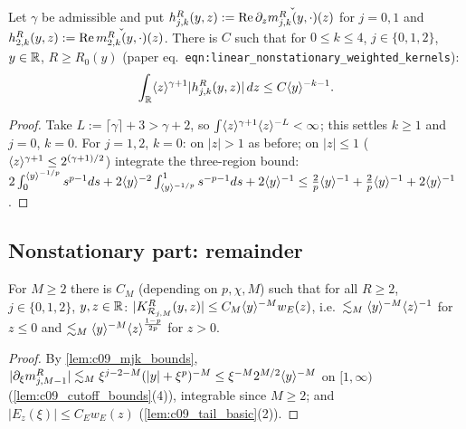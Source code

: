 \begin{lemma}
  \label{lem:c09_weighted_kernel_L1}
  Let $\gamma$ be admissible and put $h^R_{j,k}(y,z):=\operatorname{Re}\partial_z\widecheck{m^R_{j,k}(y,\cdot)}(z)$ for $j=0,1$ and $h^R_{2,k}(y,z):=\operatorname{Re}\widecheck{m^R_{2,k}(y,\cdot)}(z)$.
  There is $C$ such that for $0\le k\le4$, $j\in\{0,1,2\}$, $y\in\R$, $R\ge R_0(y)$ (paper eq.~\texttt{eqn:linear\_nonstationary\_weighted\_kernels}):
  \[
    \int_\R\ang{z}^{\gamma+1}|h^R_{j,k}(y,z)|\,dz\le C\ang{y}^{-k-1}.
  \]
\end{lemma}
\begin{proof}
  Take $L:=\lceil\gamma\rceil+3>\gamma+2$, so $\int\ang z^{\gamma+1}\ang z^{-L}<\infty$; this settles $k\ge1$ and $j=0$, $k=0$. For $j=1,2$, $k=0$: on $|z|>1$ as before;
  on $|z|\le1$ ($\ang z^{\gamma+1}\le2^{(\gamma+1)/2}$) integrate the three-region bound:
  $2\int_0^{\ang y^{-1/p}}s^{p-1}ds+2\ang{y}^{-2}\int_{\ang y^{-1/p}}^1s^{-p-1}ds+2\ang y^{-1}\le\frac2p\ang y^{-1}+\frac2p\ang y^{-1}+2\ang{y}^{-1}$.
\end{proof}

\subsection{Nonstationary part: remainder}

\begin{lemma}
  \label{lem:linear_nonstationary_remainder}
  For $M\ge2$ there is $C_M$ (depending on $p,\chi,M$) such that for all $R\ge2$, $j\in\{0,1,2\}$, $y,z\in\R$:
  $|K^R_{\mc R_{j,M}}(y,z)|\le C_M\ang{y}^{-M}w_E(z)$, i.e.\ $\lesssim_M\ang y^{-M}\ang z^{-1}$ for $z\le0$ and $\lesssim_M\ang y^{-M}\ang z^{\frac{1-p}{2p}}$ for $z>0$.
\end{lemma}
\begin{proof}
  By \cref{lem:c09_mjk_bounds}, $|\partial_\xi m^R_{j,M-1}|\lesssim_M\xi^{j-2-M}(|y|+\xi^p)^{-M}\le\xi^{-M}2^{M/2}\ang{y}^{-M}$ on $[1,\infty)$ (\cref{lem:c09_cutoff_bounds}(4)), integrable
  since $M\ge2$; and $|E_z(\xi)|\le C_Ew_E(z)$ (\cref{lem:c09_tail_basic}(2)).
\end{proof}

